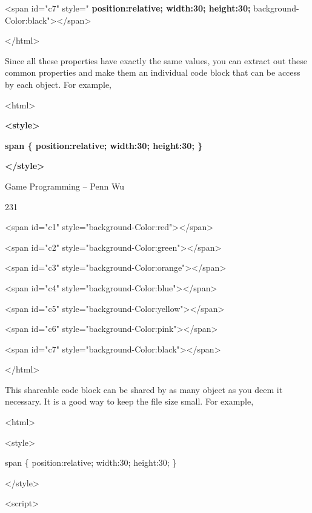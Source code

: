 \documentclass[
]{article}
\begin{document}
\textless span id="c7" style=" \textbf{position:relative; width:30;
height:30;}
background-Color:black"\textgreater\textless/span\textgreater{}

\textless/html\textgreater{}

Since all these properties have exactly the same values, you can extract
out these common properties and make them an individual code block that
can be access by each object. For example,

\textless html\textgreater{}

\textbf{\textless style\textgreater{}}

\textbf{span \{ position:relative; width:30; height:30; \}}

\textbf{\textless/style\textgreater{}}

Game Programming -- Penn Wu

231

\protect\hypertarget{index_split_012.htmlux5cux23p232}{}{}

\textless span id="c1"
style="background-Color:red"\textgreater\textless/span\textgreater{}

\textless span id="c2"
style="background-Color:green"\textgreater\textless/span\textgreater{}

\textless span id="c3"
style="background-Color:orange"\textgreater\textless/span\textgreater{}

\textless span id="c4"
style="background-Color:blue"\textgreater\textless/span\textgreater{}

\textless span id="c5"
style="background-Color:yellow"\textgreater\textless/span\textgreater{}

\textless span id="c6"
style="background-Color:pink"\textgreater\textless/span\textgreater{}

\textless span id="c7"
style="background-Color:black"\textgreater\textless/span\textgreater{}

\textless/html\textgreater{}

This shareable code block can be shared by as many object as you deem it
necessary. It is a good way to keep the file size small. For example,

\textless html\textgreater{}

\textless style\textgreater{}

span \{ position:relative; width:30; height:30; \}

\textless/style\textgreater{}

\textless script\textgreater{}
\end{document}
